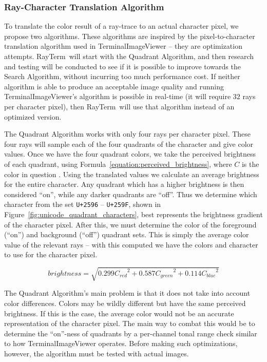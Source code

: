 \documentclass[11pt]{article}
\def\widow#1{\vskip #1\vbadness10000\penalty-200\vskip-#1}
\def\littlesection#1{
  \widow{2cm}
  \vskip 0.5cm
  \noindent{\bf #1}
  \vskip 0.0001cm
}
\newcommand{\name}{{\sc RayTerm}}
\begin{document}
\subsubsection{Ray-Character Translation Algorithm}
\label{sec:method:ray_character_algorithm}

To translate the color result of a ray-trace to an actual character pixel, we propose two algorithms.
These algorithms are inspired by the pixel-to-character translation algorithm used in TerminalImageViewer \cite{tivGithub} -- they are optimization attempts.
\name\ will start with the Quadrant Algorithm, and then research and testing will be conducted to see if it is possible to improve towards the Search Algorithm, without incurring too much performance cost.
If neither algorithm is able to produce an acceptable image quality and running TerminalImageViewer's algorithm is possible in real-time (it will require $32$ rays per character pixel), then \name\ will use that algorithm instead of an optimized version.


\littlesection{Quadrant Algorithm}

The Quadrant Algorithm works with only four rays per character pixel.
These four rays will sample each of the four quadrants of the character and give color values.
Once we have the four quadrant colors, we take the perceived brightness of each quadrant, using Formula~\ref{equation:perceived_brightness}, where $C$ is the color in question \cite{finley2006hsp}.
Using the translated values we calculate an average brightness for the entire character.
Any quadrant which has a higher brightness is then considered ``on'', while any darker quadrants are ``off''.
Thus we determine which character from the set \texttt{U+2596} -- \texttt{U+259F}, shown in Figure~\ref{fig:unicode_quadrant_characters}, best represents the brightness gradient of the character pixel.
After this, we must determine the color of the foreground (``on'') and background (``off'') quadrant sets.
This is simply the average color value of the relevant rays -- with this computed we have the colors and character to use for the character pixel.

\begin{equation}
  \label{equation:perceived_brightness}
  {brightness} = \sqrt{0.299 {C_{red}}^2 + 0.587 {C_{green}}^2 + 0.114 {C_{blue}}^2}
\end{equation}

The Quadrant Algorithm's main problem is that it does not take into account color differences.
Colors may be wildly different but have the same perceived brightness.
If this is the case, the average color would not be an accurate representation of the character pixel.
The main way to combat this would be to determine the ``on''-ness of quadrants by a per-channel tonal range check similar to how TerminalImageViewer operates.
Before making such optimizations, however, the algorithm must be tested with actual images.
\end{document}
